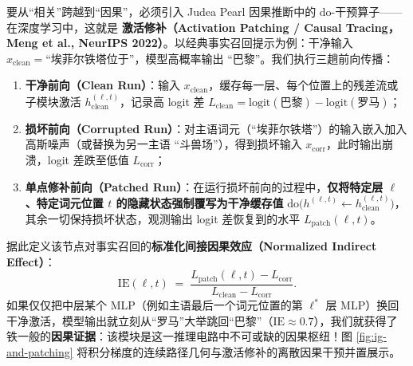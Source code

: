 要从“相关”跨越到“因果”，必须引入 Judea Pearl 因果推断中的 $\mathrm{do}$-干预算子——在深度学习中，这就是 \textbf{激活修补（Activation Patching / Causal Tracing，Meng et al., NeurIPS 2022）}。以经典事实召回提示为例：干净输入 $x_{\text{clean}} = \text{``埃菲尔铁塔位于''}$，模型高概率输出 $\text{``巴黎''}$。我们执行三趟前向传播：
\begin{enumerate}
  \item \textbf{干净前向（Clean Run）}：输入 $x_{\text{clean}}$，缓存每一层、每个位置上的残差流或子模块激活 $h^{(\ell, t)}_{\text{clean}}$，记录高 logit 差 $L_{\text{clean}} = \mathrm{logit}(\text{巴黎}) - \mathrm{logit}(\text{罗马})$；
  \item \textbf{损坏前向（Corrupted Run）}：对主语词元（``埃菲尔铁塔''）的输入嵌入加入高斯噪声（或替换为另一主语 ``斗兽场''），得到损坏输入 $x_{\text{corr}}$，此时输出崩溃，logit 差跌至低值 $L_{\text{corr}}$；
  \item \textbf{单点修补前向（Patched Run）}：在运行损坏前向的过程中，\textbf{仅将特定层 $\ell$、特定词元位置 $t$ 的隐藏状态强制覆写为干净缓存值} $\mathrm{do}\!\big(h^{(\ell, t)} \leftarrow h^{(\ell, t)}_{\text{clean}}\big)$，其余一切保持损坏状态，观测输出 logit 差恢复到的水平 $L_{\text{patch}}(\ell, t)$。
\end{enumerate}
据此定义该节点对事实召回的\textbf{标准化间接因果效应（Normalized Indirect Effect）}：
\begin{equation}\label{eq:activation-patching}
  \mathrm{IE}(\ell, t) \;=\; \frac{L_{\text{patch}}(\ell, t) - L_{\text{corr}}}{L_{\text{clean}} - L_{\text{corr}}}.
\end{equation}
如果仅仅把中层某个 MLP（例如主语最后一个词元位置的第 $\ell^*$ 层 MLP）换回干净激活，模型输出就立刻从“罗马”大举跳回“巴黎”（$\mathrm{IE} \approx 0.7$），我们就获得了铁一般的\textbf{因果证据}：该模块是这一推理电路中不可或缺的因果枢纽！图 \ref{fig:ig-and-patching} 将积分梯度的连续路径几何与激活修补的离散因果干预并置展示。

